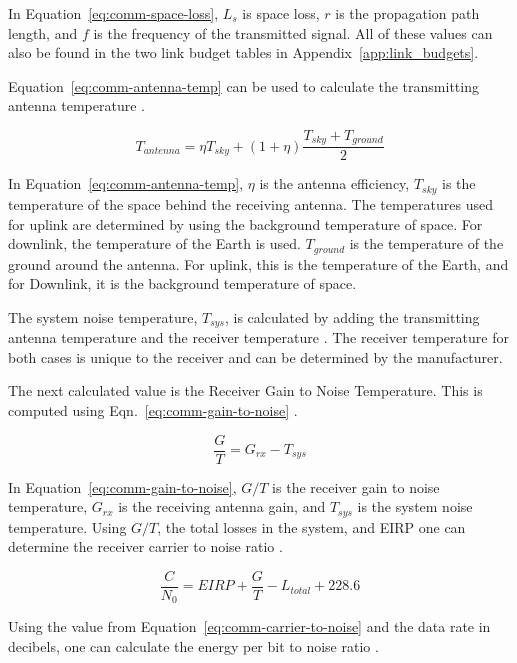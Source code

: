\documentclass[12pt]{article}
\begin{document}
In Equation~\ref{eq:comm-space-loss}, $L_s$ is space loss, $r$ is the propagation path length, and $f$ is the frequency of the transmitted signal. All of these values can also be found in the two link budget tables in Appendix~\ref{app:link_budgets}.

Equation~\ref{eq:comm-antenna-temp} can be used to calculate the transmitting antenna temperature \cite{pozar}.

\begin{equation}\label{eq:comm-antenna-temp}
T_{antenna} = \eta T_{sky} + (1 + \eta) \frac{T_{sky} + T_{ground}}{2} 
\end{equation}

In Equation~\ref{eq:comm-antenna-temp}, $\eta$ is the antenna efficiency, $T_{sky}$ is the temperature of the space behind the receiving antenna. The temperatures used for uplink are determined by using the background temperature of space. For downlink, the temperature of the Earth is used. $T_{ground}$ is the temperature of the ground around the antenna. For uplink, this is the temperature of the Earth, and for Downlink, it is the background temperature of space.

The system noise temperature, $T_{sys}$, is calculated by adding the transmitting antenna temperature and the receiver temperature \cite{pozar}. The receiver temperature for both cases is unique to the receiver and can be determined by the manufacturer.

The next calculated value is the Receiver Gain to Noise Temperature. This is computed using Eqn.~\ref{eq:comm-gain-to-noise} \cite[p.~477]{SMAD}.

\begin{equation}\label{eq:comm-gain-to-noise}
\frac{G}{T} =  G_{rx} - T_{sys} 
\end{equation}

In Equation~\ref{eq:comm-gain-to-noise}, $G/T$ is the receiver gain to noise temperature, $G_{rx}$ is the receiving antenna gain, and $T_{sys}$ is the system noise temperature. Using $G/T$, the total losses in the system, and EIRP one can determine the receiver carrier to noise ratio \cite[p.~477]{SMAD}.

\begin{equation}\label{eq:comm-carrier-to-noise}
\frac{C}{N_0} = EIRP + \frac{G}{T} - L_{total} + 228.6 
\end{equation}

Using the value from Equation~\ref{eq:comm-carrier-to-noise} and the data rate in decibels, one can calculate the energy per bit to noise ratio \cite[p.~478]{SMAD}.
\end{document}
